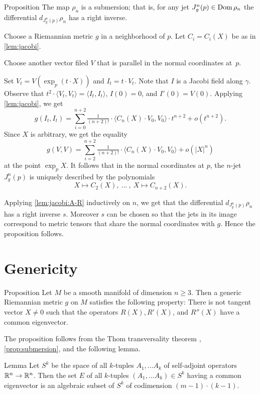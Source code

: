 \documentclass[a4paper,10pt]{article}
\begin{document}
\begin{thm}{Proposition}\label{prop:submersion}
The map $\rho_n$ is a submersion;
that is, for any jet $J^n_g(p)\z\in \Dom \rho_n$ the differential $d_{J^n_g(p)}\rho_n$ has a right inverse.
\end{thm}

Choose a Riemannian metric $g$ in a neighborhood of $p$.
Let $C_i=C_i(X)$ be as in \ref{lem:jacobi}.

Choose another vector filed $V$ that is parallel in the normal coordinates at~$p$.

Set $V_t=V(\exp_p(t\cdot X))$ and $I_t=t\cdot V_t$.
Note that $I$ is a Jacobi field along $\gamma$.
Observe that $t^2\cdot \langle V_t, V_t\rangle=\langle I_t, I_t\rangle$, $I(0)=0$, and $I'(0)=V(0)$.
Applying \ref{lem:jacobi}, we get
\[g(I_t, I_t)=\sum_{i=0}^{n+2}\tfrac1{(n+2)!}\cdot\langle C_n(X)\cdot V_0,V_0\rangle\cdot t^{n+2}+o(t^{n+2}).\]
Since $X$ is arbitrary, we get the equality
\[g( V, V)=\sum_{i=2}^{n+2}\tfrac1{(n+2)!}\cdot\langle C_n(X)\cdot V_0,V_0\rangle+o(|X|^{n})\]
at the point $\exp_p X$.
It follows that in the normal coordinates at $p$,
the $n$-jet $J^n_g(p)$ is uniquely described by the polynomials
\[X\mapsto C_2(X),
\ \dots\ ,\  
X\mapsto C_{n+2}(X).\]

Applying \ref{lem:jacobi:A-R} inductively on $n$, we get that the differential 
$d_{J^n_g(p)}\rho_n$ has a right inverse $s$.
Moreover $s$ can be chosen so that the jets in its image correspond to metric tensors that share the normal coordinates with $g$.
Hence the proposition follows.
\qeds 

\section{Genericity}

\begin{thm}{Proposition}
Let $M$ be a smooth manifold of dimension $n\ge 3$.
Then a generic Riemannian metric $g$ on $M$ satisfies the following property:
There is not tangent vector $X\ne 0$ such that the operators
$R(X), R'(X)$, and $R''(X)$ have a common eigenvector.
\end{thm}

The proposition follows from the Thom transversality theorem \cite[2.3.2]{eliashberg-mishachev}, \ref{prop:submersion}, and the following lemma.


\begin{thm}{Lemma}
Let $S^k$ be the space of all $k$-tuples $A_1,\dots A_k$ of self-adjoint operators $\mathbb{R}^n\to\mathbb{R}^n$.
Then the set $E$ of all $k$-tuples $(A_1,...A_k) \in S^k$  having a common eigenvector is an algebraic subset of $S^k$ of codimension $(m-1)\cdot (k-1)$.
\end{thm}
\end{document}
